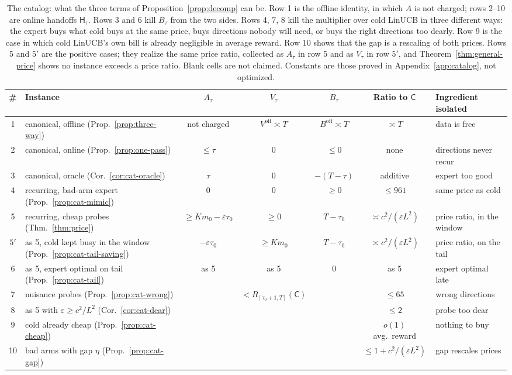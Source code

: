 \documentclass{article}
\theoremstyle{definition}
\theoremstyle{remark}
\newcommand{\eps}{\varepsilon}
\theoremstyle{remark}
\newcommand{\Cold}{\mathsf{C}}
\newcommand{\Hyb}{\mathsf{H}}
\begin{document}
\begin{table}[t]
\centering
\scriptsize
\setlength{\tabcolsep}{2.5pt}
\begin{tabular}{@{}clccccl@{}}
\toprule
\# & Instance & $A_\tau$ & $V_\tau$ & $B_\tau$ & Ratio to $\Cold$ & Ingredient isolated\\
\midrule
1 & canonical, offline (Prop.~\ref{prop:three-way}) & not charged & $V^{\mathrm{off}}\asymp T$ & $B^{\mathrm{off}}\asymp T$ & $\asymp T$ & data is free\\
2 & canonical, online (Prop.~\ref{prop:one-pass}) & $\le\tau$ & $0$ & $\le0$ & none & directions never recur\\
3 & canonical, oracle (Cor.~\ref{cor:cat-oracle}) & $\tau$ & $0$ & $-(T-\tau)$ & additive & expert too good\\
4 & recurring, bad-arm expert (Prop.~\ref{prop:cat-mimic}) & $0$ & $0$ & $\ge0$ & $\le961$ & same price as cold\\
5 & recurring, cheap probes (Thm.~\ref{thm:price}) & $\ge Km_0-\eps\tau_0$ & $\ge0$ & $T-\tau_0$ & $\asymp c^2/(\eps L^2)$ & price ratio, in the window\\
$5'$ & as 5, cold kept busy in the window (Prop.~\ref{prop:cat-tail-saving}) & $-\eps\tau_0$ & $\ge Km_0$ & $T-\tau_0$ & $\asymp c^2/(\eps L^2)$ & price ratio, on the tail\\
6 & as 5, expert optimal on tail (Prop.~\ref{prop:cat-tail}) & as 5 & as 5 & $0$ & as 5 & expert optimal late\\
7 & nuisance probes (Prop.~\ref{prop:cat-wrong}) & & $<R_{[\tau_0+1,T]}(\Cold)$ & & $\le65$ & wrong directions\\
8 & as 5 with $\eps\ge c^2/L^2$ (Cor.~\ref{cor:cat-dear}) & & & & $\le2$ & probe too dear\\
9 & cold already cheap (Prop.~\ref{prop:cat-cheap}) & & & & $o(1)$ avg.\ reward & nothing to buy\\
10 & bad arms with gap $\eta$ (Prop.~\ref{prop:cat-gap}) & & & & $\le1+c^2/(\eps L^2)$ & gap rescales prices\\
\bottomrule
\end{tabular}
\caption{The catalog: what the three terms of Proposition~\ref{prop:decomp} can be.
Row 1 is the offline identity, in which $A$ is not charged; rows 2--10 are
online handoffs $\Hyb_\tau$. Rows 3 and 6 kill $B_\tau$ from the two sides.
Rows 4, 7, 8 kill the multiplier over cold LinUCB in three different ways:
the expert buys what cold buys at the same price, buys directions nobody will
need, or buys the right directions too dearly. Row 9 is the case in which cold
LinUCB's own bill is already negligible in average reward. Row 10 shows that
the gap is a rescaling of both prices. Rows 5 and $5'$ are the positive
cases; they realize the same price ratio, collected as $A_\tau$ in row 5 and
as $V_\tau$ in row $5'$, and Theorem~\ref{thm:general-price} shows no
instance exceeds a price ratio. Blank cells are not claimed. Constants are
those proved in Appendix~\ref{app:catalog}, not optimized.}
\label{tab:catalog}
\end{table}
\end{document}
